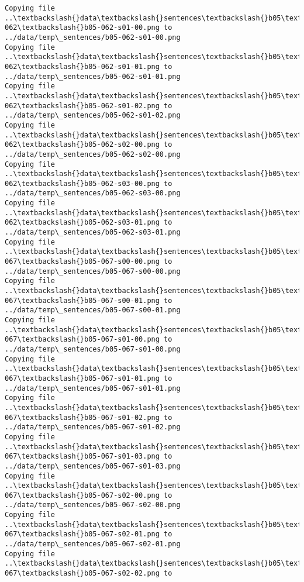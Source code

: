 \documentclass[11pt]{article}
\begin{document}
\begin{Verbatim}[commandchars=\\\{\}]
Copying file ..\textbackslash{}data\textbackslash{}sentences\textbackslash{}b05\textbackslash{}b05-062\textbackslash{}b05-062-s01-00.png to
../data/temp\_sentences/b05-062-s01-00.png
Copying file ..\textbackslash{}data\textbackslash{}sentences\textbackslash{}b05\textbackslash{}b05-062\textbackslash{}b05-062-s01-01.png to
../data/temp\_sentences/b05-062-s01-01.png
Copying file ..\textbackslash{}data\textbackslash{}sentences\textbackslash{}b05\textbackslash{}b05-062\textbackslash{}b05-062-s01-02.png to
../data/temp\_sentences/b05-062-s01-02.png
Copying file ..\textbackslash{}data\textbackslash{}sentences\textbackslash{}b05\textbackslash{}b05-062\textbackslash{}b05-062-s02-00.png to
../data/temp\_sentences/b05-062-s02-00.png
Copying file ..\textbackslash{}data\textbackslash{}sentences\textbackslash{}b05\textbackslash{}b05-062\textbackslash{}b05-062-s03-00.png to
../data/temp\_sentences/b05-062-s03-00.png
Copying file ..\textbackslash{}data\textbackslash{}sentences\textbackslash{}b05\textbackslash{}b05-062\textbackslash{}b05-062-s03-01.png to
../data/temp\_sentences/b05-062-s03-01.png
Copying file ..\textbackslash{}data\textbackslash{}sentences\textbackslash{}b05\textbackslash{}b05-067\textbackslash{}b05-067-s00-00.png to
../data/temp\_sentences/b05-067-s00-00.png
Copying file ..\textbackslash{}data\textbackslash{}sentences\textbackslash{}b05\textbackslash{}b05-067\textbackslash{}b05-067-s00-01.png to
../data/temp\_sentences/b05-067-s00-01.png
Copying file ..\textbackslash{}data\textbackslash{}sentences\textbackslash{}b05\textbackslash{}b05-067\textbackslash{}b05-067-s01-00.png to
../data/temp\_sentences/b05-067-s01-00.png
Copying file ..\textbackslash{}data\textbackslash{}sentences\textbackslash{}b05\textbackslash{}b05-067\textbackslash{}b05-067-s01-01.png to
../data/temp\_sentences/b05-067-s01-01.png
Copying file ..\textbackslash{}data\textbackslash{}sentences\textbackslash{}b05\textbackslash{}b05-067\textbackslash{}b05-067-s01-02.png to
../data/temp\_sentences/b05-067-s01-02.png
Copying file ..\textbackslash{}data\textbackslash{}sentences\textbackslash{}b05\textbackslash{}b05-067\textbackslash{}b05-067-s01-03.png to
../data/temp\_sentences/b05-067-s01-03.png
Copying file ..\textbackslash{}data\textbackslash{}sentences\textbackslash{}b05\textbackslash{}b05-067\textbackslash{}b05-067-s02-00.png to
../data/temp\_sentences/b05-067-s02-00.png
Copying file ..\textbackslash{}data\textbackslash{}sentences\textbackslash{}b05\textbackslash{}b05-067\textbackslash{}b05-067-s02-01.png to
../data/temp\_sentences/b05-067-s02-01.png
Copying file ..\textbackslash{}data\textbackslash{}sentences\textbackslash{}b05\textbackslash{}b05-067\textbackslash{}b05-067-s02-02.png to

\end{Verbatim}
\end{document}

